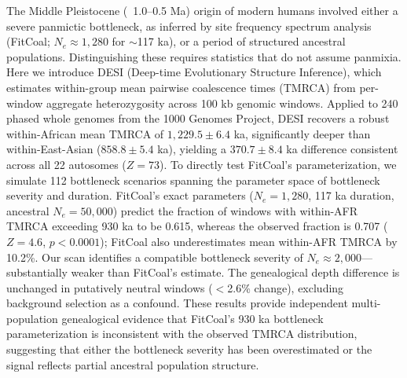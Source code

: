 
The Middle Pleistocene (~1.0--0.5 Ma) origin of modern humans involved either a severe panmictic bottleneck, as inferred by site frequency spectrum analysis (FitCoal; $N_e \approx 1{,}280$ for $\sim$117 ka), or a period of structured ancestral populations. Distinguishing these requires statistics that do not assume panmixia. Here we introduce DESI (Deep-time Evolutionary Structure Inference), which estimates within-group mean pairwise coalescence times (TMRCA) from per-window aggregate heterozygosity across 100 kb genomic windows. Applied to 240 phased whole genomes from the 1000 Genomes Project, DESI recovers a robust within-African mean TMRCA of $1{,}229.5 \pm 6.4$ ka, significantly deeper than within-East-Asian ($858.8 \pm 5.4$ ka), yielding a $370.7 \pm 8.4$ ka difference consistent across all 22 autosomes ($Z = 73$). To directly test FitCoal's parameterization, we simulate 112 bottleneck scenarios spanning the parameter space of bottleneck severity and duration. FitCoal's exact parameters ($N_e = 1{,}280$, 117 ka duration, ancestral $N_e = 50{,}000$) predict the fraction of windows with within-AFR TMRCA exceeding 930 ka to be 0.615, whereas the observed fraction is 0.707 ($Z = 4.6$, $p < 0.0001$); FitCoal also underestimates mean within-AFR TMRCA by 10.2\%. Our scan identifies a compatible bottleneck severity of $N_e \approx 2{,}000$---substantially weaker than FitCoal's estimate. The genealogical depth difference is unchanged in putatively neutral windows ($<$2.6\% change), excluding background selection as a confound. These results provide independent multi-population genealogical evidence that FitCoal's 930 ka bottleneck parameterization is inconsistent with the observed TMRCA distribution, suggesting that either the bottleneck severity has been overestimated or the signal reflects partial ancestral population structure.
